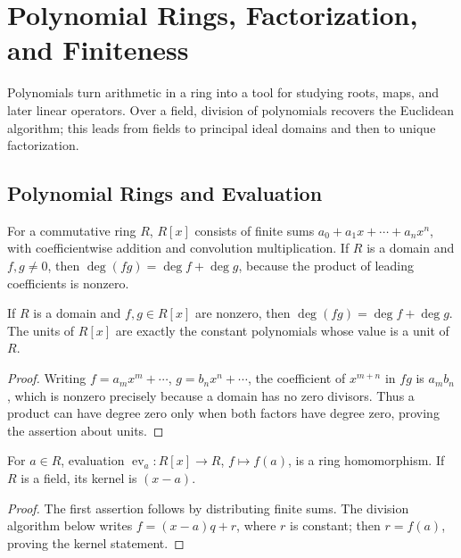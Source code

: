 \chapter{Polynomial Rings, Factorization, and Finiteness}
Polynomials turn arithmetic in a ring into a tool for studying roots, maps,
and later linear operators.  Over a field, division of polynomials recovers
the Euclidean algorithm; this leads from fields to principal ideal domains
and then to unique factorization.

\section{Polynomial Rings and Evaluation}
For a commutative ring \(R\), \(R[x]\) consists of finite sums
\(a_0+a_1x+\cdots+a_nx^n\), with coefficientwise addition and convolution
multiplication.  If \(R\) is a domain and \(f,g\ne0\), then
\(\deg(fg)=\deg f+\deg g\), because the product of leading coefficients is
nonzero.
\begin{proposition}
If \(R\) is a domain and \(f,g\in R[x]\) are nonzero, then
\(\deg(fg)=\deg f+\deg g\).  The units of \(R[x]\) are exactly the constant
polynomials whose value is a unit of \(R\).
\end{proposition}
\begin{proof}
Writing \(f=a_mx^m+\cdots\), \(g=b_nx^n+\cdots\), the coefficient of
\(x^{m+n}\) in \(fg\) is \(a_mb_n\), which is nonzero precisely because a
domain has no zero divisors.  Thus a product can have degree zero only when
both factors have degree zero, proving the assertion about units.
\end{proof}
\begin{proposition}[Evaluation] For \(a\in R\), evaluation
\(\operatorname{ev}_a:R[x]\to R\), \(f\mapsto f(a)\), is a ring
homomorphism.  If \(R\) is a field, its kernel is \((x-a)\). \end{proposition}
\begin{proof} The first assertion follows by distributing finite sums.  The
division algorithm below writes \(f=(x-a)q+r\), where \(r\) is constant;
then \(r=f(a)\), proving the kernel statement. \end{proof}

